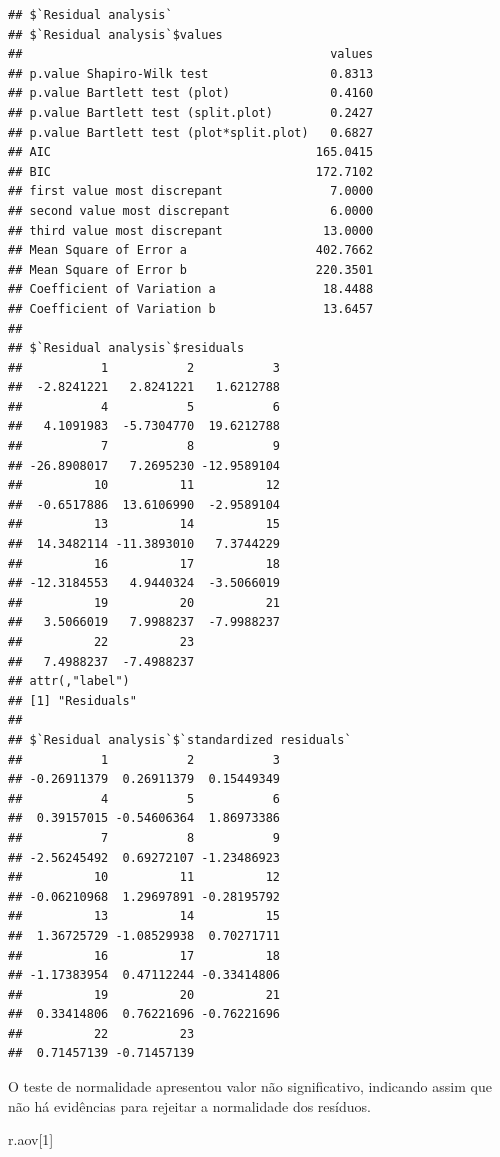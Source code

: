 \documentclass[
]{article}
\newenvironment{Shaded}{\begin{snugshade}}{\end{snugshade}}
\newcommand{\DecValTok}[1]{\textcolor[rgb]{0.00,0.00,0.81}{#1}}
\newcommand{\NormalTok}[1]{#1}
\begin{document}
\begin{verbatim}
## $`Residual analysis`
## $`Residual analysis`$values
##                                           values
## p.value Shapiro-Wilk test                 0.8313
## p.value Bartlett test (plot)              0.4160
## p.value Bartlett test (split.plot)        0.2427
## p.value Bartlett test (plot*split.plot)   0.6827
## AIC                                     165.0415
## BIC                                     172.7102
## first value most discrepant               7.0000
## second value most discrepant              6.0000
## third value most discrepant              13.0000
## Mean Square of Error a                  402.7662
## Mean Square of Error b                  220.3501
## Coefficient of Variation a               18.4488
## Coefficient of Variation b               13.6457
## 
## $`Residual analysis`$residuals
##           1           2           3 
##  -2.8241221   2.8241221   1.6212788 
##           4           5           6 
##   4.1091983  -5.7304770  19.6212788 
##           7           8           9 
## -26.8908017   7.2695230 -12.9589104 
##          10          11          12 
##  -0.6517886  13.6106990  -2.9589104 
##          13          14          15 
##  14.3482114 -11.3893010   7.3744229 
##          16          17          18 
## -12.3184553   4.9440324  -3.5066019 
##          19          20          21 
##   3.5066019   7.9988237  -7.9988237 
##          22          23 
##   7.4988237  -7.4988237 
## attr(,"label")
## [1] "Residuals"
## 
## $`Residual analysis`$`standardized residuals`
##           1           2           3 
## -0.26911379  0.26911379  0.15449349 
##           4           5           6 
##  0.39157015 -0.54606364  1.86973386 
##           7           8           9 
## -2.56245492  0.69272107 -1.23486923 
##          10          11          12 
## -0.06210968  1.29697891 -0.28195792 
##          13          14          15 
##  1.36725729 -1.08529938  0.70271711 
##          16          17          18 
## -1.17383954  0.47112244 -0.33414806 
##          19          20          21 
##  0.33414806  0.76221696 -0.76221696 
##          22          23 
##  0.71457139 -0.71457139
\end{verbatim}

O teste de normalidade apresentou valor não significativo, indicando assim que não há evidências para rejeitar a normalidade dos resíduos.

\begin{Shaded}
\begin{Highlighting}[]
\NormalTok{r.aov[}\DecValTok{1}\NormalTok{]}
\end{Highlighting}
\end{Shaded}
\end{document}
